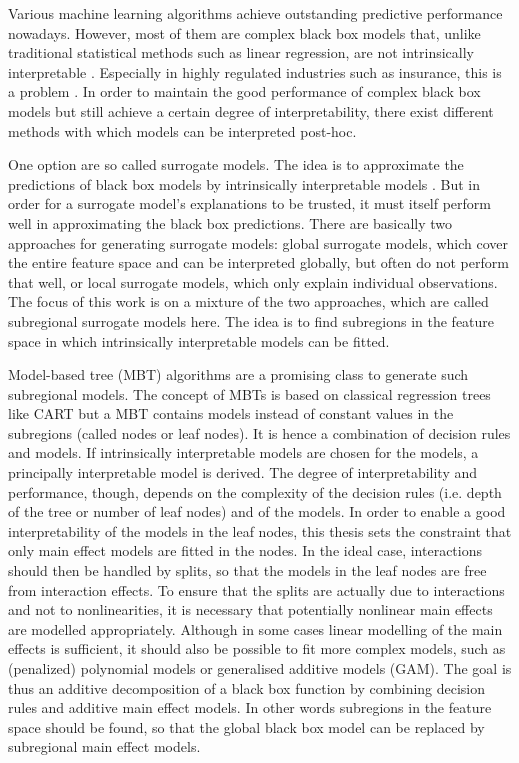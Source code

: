 Various machine learning algorithms achieve outstanding predictive performance nowadays. However, most of them are complex black box models that, unlike traditional statistical methods such as linear regression, are not intrinsically interpretable \citep{Hu.2020}.
Especially in highly regulated industries such as insurance, this is a problem \citep{Henckaerts.2022}.
In order to maintain the good performance of complex black box models but still achieve a certain degree of interpretability, there exist different methods with which models can be interpreted post-hoc. 


One option are so called surrogate models. The idea is to approximate the predictions of black box models by intrinsically interpretable models \citep{Molnar.2019}.
But in order for a surrogate model's explanations to be trusted, it must itself perform well in approximating the black box predictions.
There are basically two approaches for generating surrogate models: global surrogate models, which cover the entire feature space and can be interpreted globally, but often do not perform that well, or local surrogate models, which only explain individual observations.  The focus of this work is on a mixture of the two approaches, which are called subregional surrogate models here. 
The idea is to find subregions in the feature space in which intrinsically interpretable models can be fitted.


Model-based tree (MBT) algorithms are a promising class to generate such subregional models. 
The concept of MBTs is based on classical regression trees like CART \citep{Breiman.1984} but a MBT contains models instead of constant values in the subregions (called nodes or leaf nodes).
It is hence a combination of decision rules and models. If intrinsically interpretable models are chosen for the models, a principally interpretable model is derived. The degree of interpretability and performance, though, depends on the complexity of the decision rules (i.e. depth of the tree or number of leaf nodes) and of the models.
In order to enable a good interpretability of the models in the leaf nodes, this thesis sets the constraint that only main effect models are fitted in the nodes. 
In the ideal case, interactions should then be handled by  splits, so that the models in the leaf nodes are free from interaction effects.
To ensure that the splits are actually due to interactions and not to nonlinearities, it is necessary that potentially nonlinear main effects are modelled appropriately.
Although in some cases linear modelling of the main effects is sufficient, it should also be possible to fit more complex models, such as (penalized) polynomial models or generalised additive models (GAM).
The goal is thus an additive decomposition of a black box function by combining decision rules and additive main effect models.  In other words
subregions in the feature space should be found, so that the global black box model can be replaced by subregional main effect models.


